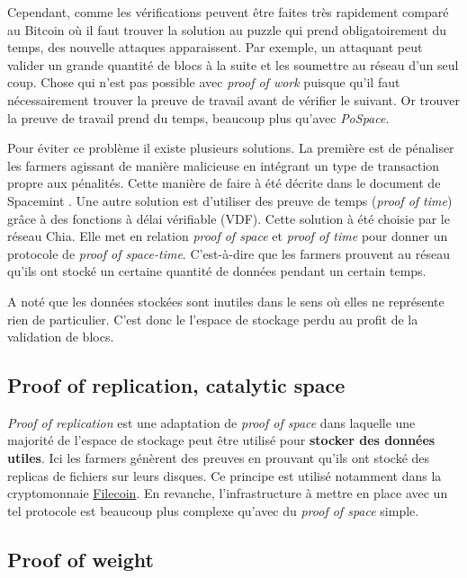 \documentclass[../tb_report.tex]{subfiles}
\begin{document}
Cependant, comme les vérifications peuvent être faites très rapidement comparé au Bitcoin où il faut trouver la solution au puzzle qui prend obligatoirement du temps, des nouvelle attaques apparaissent. Par exemple, un attaquant peut valider un grande quantité de blocs à la suite et les soumettre au réseau d'un seul coup. Chose qui n'est pas possible avec \textit{proof of work} puisque qu'il faut nécessairement trouver la preuve de travail avant de vérifier le suivant. Or trouver la preuve de travail prend du temps, beaucoup plus qu'avec \textit{PoSpace}. 

Pour éviter ce problème il existe plusieurs solutions. La première est de pénaliser les farmers agissant de manière malicieuse en intégrant un type de transaction propre aux pénalités. Cette manière de faire à été décrite dans le document de Spacemint \cite{DBLP:conf/fc/ParkKFGAP18}. Une autre solution est d'utiliser des preuve de temps (\textit{proof of time}) grâce à des fonctions à délai vérifiable (VDF). Cette solution à été choisie par le réseau Chia. Elle met en relation \textit{proof of space} et \textit{proof of time} pour donner un protocole de \textit{proof of space-time}. C'est-à-dire que les farmers prouvent au réseau qu'ils ont stocké un certaine quantité de données pendant un certain temps.

A noté que les données stockées sont inutiles dans le sens où elles ne représente rien de particulier. C'est donc le l'espace de stockage perdu au profit de la validation de blocs.

\subsection{Proof of replication, catalytic space}

\textit{Proof of replication} est une adaptation de \textit{proof of space} dans laquelle une majorité de l'espace de stockage peut être utilisé pour \textbf{stocker des données utiles}. Ici les farmers génèrent des preuves en prouvant qu'ils ont stocké des replicas de fichiers sur leurs disques. Ce principe est utilisé notamment dans la cryptomonnaie \href{https://filecoin.io/}{Filecoin}. En revanche, l'infrastructure à mettre en place avec un tel protocole est beaucoup plus complexe qu'avec du \textit{proof of space} simple.

\subsection{Proof of weight}
\end{document}
